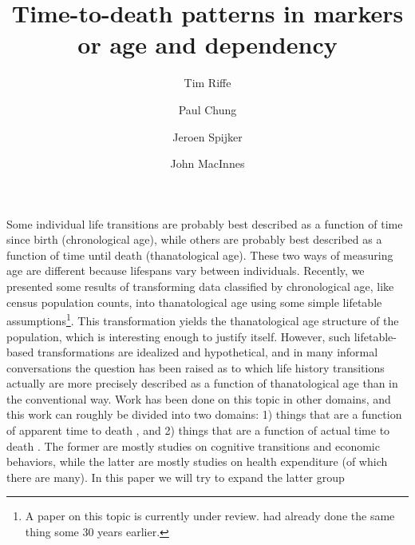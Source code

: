 \documentclass{article}
\begin{document}
\title{Time-to-death patterns in markers or age and dependency}

\author[1]{Tim Riffe}
\author[1]{Paul Chung}
\author[2]{Jeroen Spijker}
\author[2]{John MacInnes}

\maketitle

Some individual life transitions are probably best described as a function of
time since birth (chronological age), while others are probably best described as a
function of time until death (thanatological age). These two ways of
measuring age are different because lifespans vary between individuals.
Recently, we presented some results of transforming
data classified by chronological age, like census population counts, into
thanatological age using some simple lifetable
assumptions\footnote{\citep{riffe2014paaposter} A paper on this topic is
currently under review. \citet{brouard1986structure, brouard1989mouvements}
had already done the same thing some 30 years earlier.}.
This transformation yields the thanatological age structure of the population,
which is interesting enough to justify itself. However, such lifetable-based
transformations are idealized and hypothetical, and in many informal
conversations the question has been raised as to which life history transitions
actually are more precisely described as a function of thanatological age than
in the conventional way. Work has been done on this topic in other domains, and
this work can roughly be divided into two domains: 1) things that are a function
of apparent time to death \citep{carstensen2006influence,gan2004subjective,salm2010subjective,van2010living},
and 2) things that are a function of actual time to death
\citep{miller2001increasing,seshamani2004longitudinal}. The former are mostly
studies on cognitive transitions and economic behaviors, while the latter are
mostly studies on health expenditure (of which there are many). In this paper we
will try to expand the latter group



   
  
\end{document}

